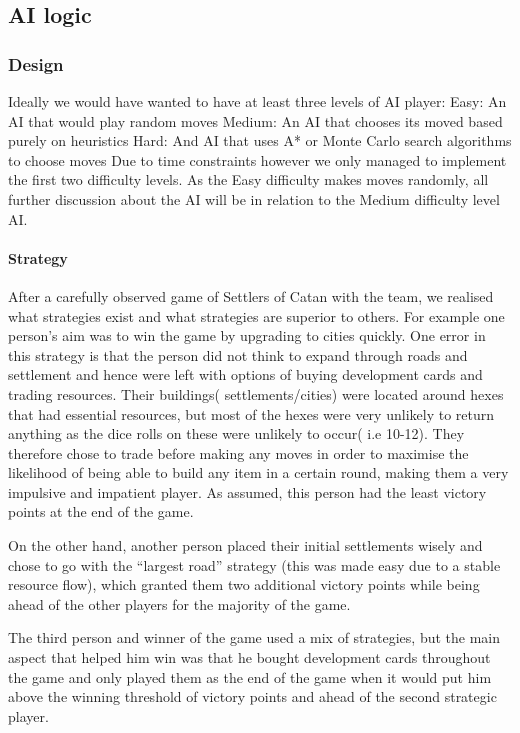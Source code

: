 \documentclass[a4paper,doc,draftfirst]{apa6}
\begin{document}
\subsection{AI logic}
\subsubsection{Design}
Ideally we would have wanted to have at least three levels of AI player:
Easy: An AI that would play random moves
Medium: An AI that chooses its moved based purely on heuristics
Hard: And AI that uses A* or Monte Carlo search algorithms to choose moves
Due to time constraints however we only managed to implement the first two difficulty levels. As the Easy difficulty makes moves randomly, all further discussion about the AI will be in relation to the Medium difficulty level AI.

\paragraph{Strategy}
After a carefully observed game of Settlers of Catan with the team, we realised what strategies exist and what strategies are superior to others. For example one person’s aim was to win the game by upgrading to cities quickly. One error in this strategy is that the person did not think to expand through roads and settlement and hence were left with options of buying development cards and trading resources. Their buildings( settlements/cities) were located around hexes that had essential resources, but most of the hexes were very unlikely to return anything as the dice rolls on these were unlikely to occur( i.e 10-12). They therefore chose to trade before making any moves in order to maximise the likelihood of being able to build any item in a certain round, making them a very impulsive and impatient player. As assumed, this person had the least victory points at the end of the game. 

On the other hand, another person placed their initial settlements wisely and chose to go with the “largest road” strategy (this was made easy due to a stable resource flow), which granted them two additional victory points while being ahead of the other players for the majority of the game.

The third person and winner of the game used a mix of strategies, but the main aspect that helped him win was that he bought development cards throughout the game and only played them as the end of the game when it would put him above the winning threshold of victory points and ahead of the second strategic player.
\end{document}
